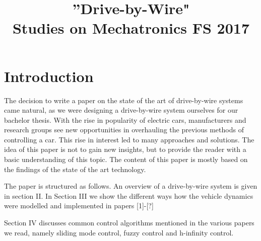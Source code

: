 \documentclass[conference]{IEEEtran}
\begin{document}
\title{
''Drive-by-Wire"
\\[0.5cm]
\large{Studies on Mechatronics FS 2017}
}

\author{
\and

}

\maketitle

\setlength\parindent{0pt}
\newcommand{\spn}[1]{\textsc{Span} \left\{ #1 \right\}}
\newcommand{\dimension}[1]{\textsc{dim} \left\{ #1 \right\}}
\newcommand{\real}[1]{\textsc{Re} \left( #1 \right)}
\newcommand{\imag}[1]{\textsc{Im} \left( #1 \right)}
\newcommand{\DET}[1]{\textsc{Det} \left[ #1 \right]}
\newcommand*\rfrac[2]{{}^{#1}\!/_{#2}}


\thispagestyle{plain}
\pagestyle{plain}



\section{Introduction}

The decision to write a paper on the state of the art of drive-by-wire systems came natural, as we were designing a drive-by-wire system ourselves for our bachelor thesis. With the rise in popularity of electric cars, manufacturers and research groups see new opportunities in overhauling the previous methods of controlling a car. This rise in interest led to many approaches and solutions. The idea of this paper is not to gain new insights, but to provide the reader with a basic understanding of this topic. The content of this paper is mostly based on the findings of the state of the art technology.

The paper is structured as follows. An overview of a drive-by-wire system is given in section II. In Section III we show the different ways how the vehicle dynamics were modelled and implemented in papers [1]-[?]

Section IV discusses common control algorithms mentioned in the various papers we read, namely sliding mode control, fuzzy control and h-infinity control. 
\end{document}
